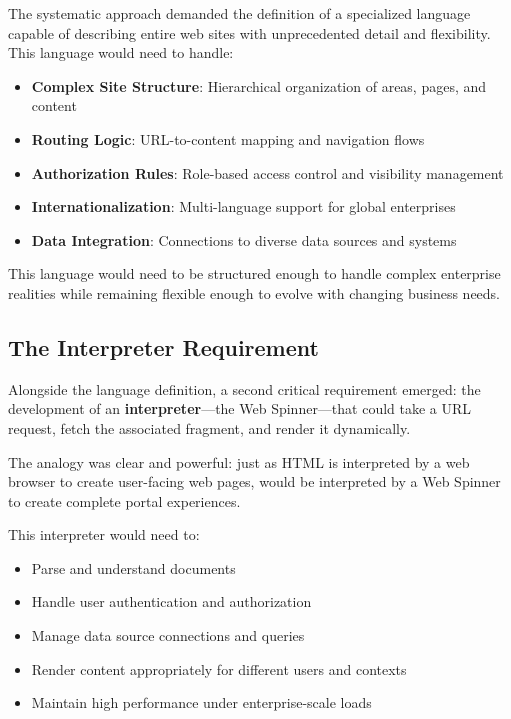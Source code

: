 The systematic approach demanded the definition of a specialized language capable of describing entire web sites with unprecedented detail and flexibility. This language would need to handle:

\begin{itemize}
\item \textbf{Complex Site Structure}: Hierarchical organization of areas, pages, and content
\item \textbf{Routing Logic}: URL-to-content mapping and navigation flows
\item \textbf{Authorization Rules}: Role-based access control and visibility management
\item \textbf{Internationalization}: Multi-language support for global enterprises
\item \textbf{Data Integration}: Connections to diverse data sources and systems
\end{itemize}

This language would need to be structured enough to handle complex enterprise realities while remaining flexible enough to evolve with changing business needs.

\subsection{The Interpreter Requirement}

Alongside the language definition, a second critical requirement emerged: the development of an \textbf{interpreter}—the Web Spinner—that could take a URL request, fetch the associated \wbdl{} fragment, and render it dynamically.

The analogy was clear and powerful: just as HTML is interpreted by a web browser to create user-facing web pages, \wbdl{} would be interpreted by a Web Spinner to create complete portal experiences.

This interpreter would need to:
\begin{itemize}
\item Parse and understand \wbdl{} documents
\item Handle user authentication and authorization
\item Manage data source connections and queries
\item Render content appropriately for different users and contexts
\item Maintain high performance under enterprise-scale loads
\end{itemize}

